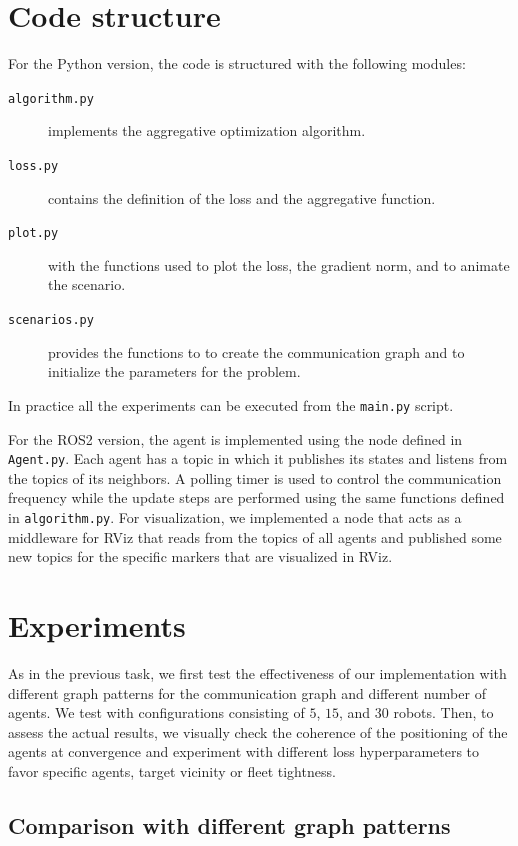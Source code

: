 \documentclass[a4paper,11pt,oneside]{book}
\begin{document}
\section{Code structure}
For the Python version, the code is structured with the following modules:
\begin{description}
      \item[\texttt{algorithm.py}] implements the aggregative optimization algorithm.
      \item[\texttt{loss.py}] contains the definition of the loss and the aggregative function.
      \item[\texttt{plot.py}] with the functions used to plot the loss, the gradient norm, and to animate the scenario.
      \item[\texttt{scenarios.py}] provides the functions to to create the communication graph and to initialize the parameters for the problem.
\end{description}
In practice all the experiments can be executed from the \texttt{main.py} script.

For the ROS2 version, the agent is implemented using the node defined in \texttt{Agent.py}. Each agent has a topic in which it publishes its states and listens from the topics of its neighbors. A polling timer is used to control the communication frequency while the update steps are performed using the same functions defined in \texttt{algorithm.py}. For visualization, we implemented a node that acts as a middleware for RViz that reads from the topics of all agents and published some new topics for the specific markers that are visualized in RViz.



\section{Experiments}

As in the previous task, we first test the effectiveness of our implementation with different graph patterns for the communication graph and different number of agents. We test with configurations consisting of $5$, $15$, and $30$ robots. Then, to assess the actual results, we visually check the coherence of the positioning of the agents at convergence and experiment with different loss hyperparameters to favor specific agents, target vicinity or fleet tightness.


\subsection{Comparison with different graph patterns}
\end{document}

